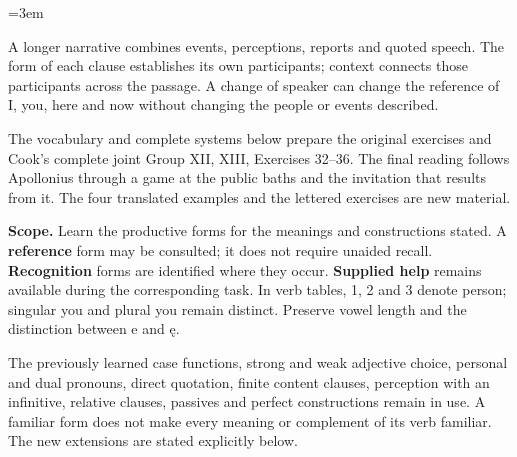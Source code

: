 \BookRecto
\begingroup
\renewcommand{\runningtitle}{Unit 16. Narrative and speech}
\emergencystretch=3em
\newcommand{\itempara}[2]{\par\addvspace{3pt}\noindent\hangindent=1.8em\hangafter=1\makebox[1.8em][l]{#1.}#2\par}
\newcommand{\reserve}[1]{\par\penalty-100\begingroup\dimen0=\pagegoal\advance\dimen0 by-\pagetotal\ifdim\dimen0<#1\newpage\fi\endgroup}

\raggedright
{}

A longer narrative combines events, perceptions, reports and quoted speech. The form of each clause establishes its own participants; context connects those participants across the passage. A change of speaker can change the reference of I, you, here and now without changing the people or events described.

The vocabulary and complete systems below prepare the original exercises and Cook’s complete joint Group XII, XIII, Exercises 32–36. The final reading follows Apollonius through a game at the public baths and the invitation that results from it. The four translated examples and the lettered exercises are new material.

\textbf{Scope.} Learn the productive forms for the meanings and constructions stated. A \textbf{reference} form may be consulted; it does not require unaided recall. \textbf{Recognition} forms are identified where they occur. \textbf{Supplied help} remains available during the corresponding task. In verb tables, 1, 2 and 3 denote person; singular you and plural you remain distinct. Preserve vowel length and the distinction between e and ę.

The previously learned case functions, strong and weak adjective choice, personal and dual pronouns, direct quotation, finite content clauses, perception with an infinitive, relative clauses, passives and perfect constructions remain in use. A familiar form does not make every meaning or complement of its verb familiar. The new extensions are stated explicitly below.

